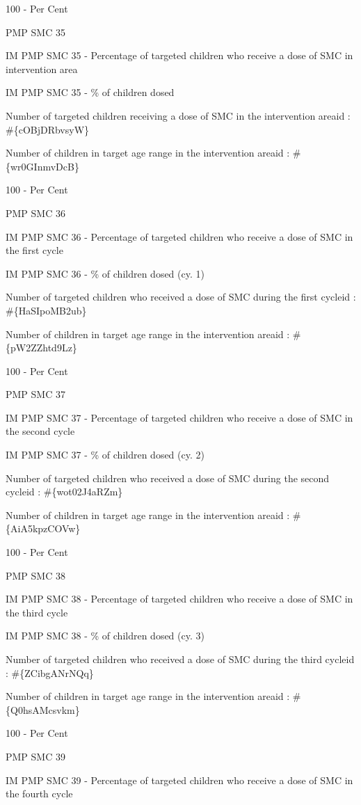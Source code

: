 \documentclass[]{book}
\begin{document}
100 - Per Cent

PMP SMC 35

IM PMP SMC 35 - Percentage of targeted children who receive a dose of SMC in intervention area

IM PMP SMC 35 - \% of children dosed

Number of targeted children receiving a dose of SMC in the intervention areaid : \#\{cOBjDRbvsyW\}

Number of children in target age range in the intervention areaid : \#\{wr0GInmvDcB\}

100 - Per Cent

PMP SMC 36

IM PMP SMC 36 - Percentage of targeted children who receive a dose of SMC in the first cycle

IM PMP SMC 36 - \% of children dosed (cy. 1)

Number of targeted children who received a dose of SMC during the first cycleid : \#\{HaSIpoMB2ub\}

Number of children in target age range in the intervention areaid : \#\{pW2ZZhtd9Lz\}

100 - Per Cent

PMP SMC 37

IM PMP SMC 37 - Percentage of targeted children who receive a dose of SMC in the second cycle

IM PMP SMC 37 - \% of children dosed (cy. 2)

Number of targeted children who received a dose of SMC during the second cycleid : \#\{wot02J4aRZm\}

Number of children in target age range in the intervention areaid : \#\{AiA5kpzCOVw\}

100 - Per Cent

PMP SMC 38

IM PMP SMC 38 - Percentage of targeted children who receive a dose of SMC in the third cycle

IM PMP SMC 38 - \% of children dosed (cy. 3)

Number of targeted children who received a dose of SMC during the third cycleid : \#\{ZCibgANrNQq\}

Number of children in target age range in the intervention areaid : \#\{Q0hsAMcsvkm\}

100 - Per Cent

PMP SMC 39

IM PMP SMC 39 - Percentage of targeted children who receive a dose of SMC in the fourth cycle
\end{document}
